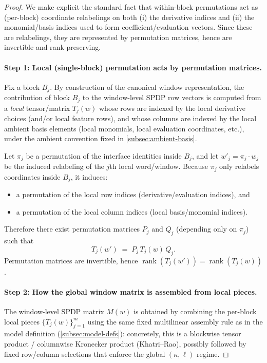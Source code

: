 \documentclass[12pt]{article}
\theoremstyle{definition}
\theoremstyle{remark}
\DeclareMathOperator{\rank}{rank}
\begin{document}
\begin{proof}
We make explicit the standard fact that within-block permutations act as
(per-block) coordinate relabelings on both (i) the derivative indices and (ii) the
monomial/basis indices used to form coefficient/evaluation vectors. Since these are
relabelings, they are represented by permutation matrices, hence are invertible and
rank-preserving.

\paragraph{Step 1: Local (single-block) permutation acts by permutation matrices.}
Fix a block $B_j$. By construction of the canonical window representation, the
contribution of block $B_j$ to the window-level SPDP row vectors is computed from a
\emph{local} tensor/matrix $T_j(w)$ whose rows are indexed by the local derivative
choices (and/or local feature rows), and whose columns are indexed by the local
ambient basis elements (local monomials, local evaluation coordinates, etc.),
under the ambient convention fixed in \ref{subsec:ambient-basis}.

Let $\pi_j$ be a permutation of the interface identities inside $B_j$, and let
$w'_j=\pi_j\cdot w_j$ be the induced relabeling of the $j$th local word/window.
Because $\pi_j$ only relabels coordinates inside $B_j$, it induces:
\begin{itemize}
\item a permutation of the local row indices (derivative/evaluation indices), and
\item a permutation of the local column indices (local basis/monomial indices).
\end{itemize}
Therefore there exist permutation matrices $P_j$ and $Q_j$ (depending only on $\pi_j$)
such that
\begin{equation}
\label{eq:local-perm}
T_j(w') \;=\; P_j \, T_j(w)\, Q_j.
\end{equation}
Permutation matrices are invertible, hence $\rank(T_j(w'))=\rank(T_j(w))$.

\paragraph{Step 2: How the global window matrix is assembled from local pieces.}
The window-level SPDP matrix $M(w)$ is obtained by combining the per-block local
pieces $\{T_j(w)\}_{j=1}^m$ using the same fixed multilinear assembly rule as in
the model definition (\ref{subsec:model-defs}): concretely, this is a
blockwise tensor product / columnwise Kronecker product (Khatri--Rao), possibly
followed by fixed row/column selections that enforce the global $(\kappa,\ell)$ regime.


\end{proof}
\end{document}
